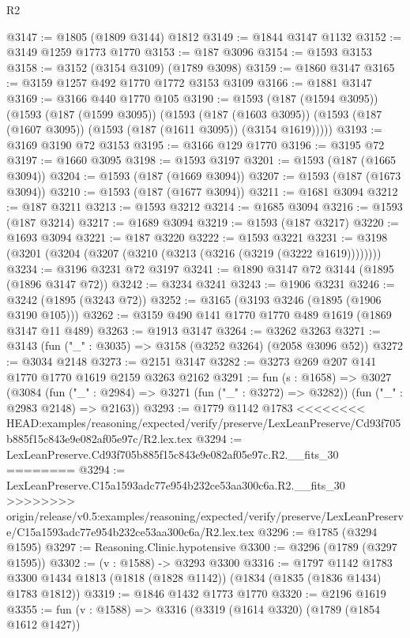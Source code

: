 \begin{lexlean}{R2}
\begin{coremodule}
{{{{{{{{{{{{{{{{{{{{{{{{{{{{{{{{{{{{{{{{{{{{{{{{{{{{{{{{{{{{{{{{{{{{{{{{{{{{{{{{{{{{{{{{{{{{@3147 := @1805 (@1809 @3144) @1812
@3149 := @1844 @3147 @1132
@3152 := @3149 @1259 @1773 @1770
@3153 := @187 @3096
@3154 := @1593 @3153
@3158 := @3152 (@3154 @3109) (@1789 @3098)
@3159 := @1860 @3147
@3165 := @3159 @1257 @492 @1770 @1772 @3153 @3109
@3166 := @1881 @3147
@3169 := @3166 @440 @1770 @105
@3190 := @1593
    (@187 (@1594 @3095))
    (@1593
      (@187 (@1599 @3095))
      (@1593
        (@187 (@1603 @3095))
        (@1593 (@187 (@1607 @3095)) (@1593 (@187 (@1611 @3095)) (@3154 @1619)))))
@3193 := @3169 @3190 @72 @3153
@3195 := @3166 @129 @1770
@3196 := @3195 @72
@3197 := @1660 @3095
@3198 := @1593 @3197
@3201 := @1593 (@187 (@1665 @3094))
@3204 := @1593 (@187 (@1669 @3094))
@3207 := @1593 (@187 (@1673 @3094))
@3210 := @1593 (@187 (@1677 @3094))
@3211 := @1681 @3094
@3212 := @187 @3211
@3213 := @1593 @3212
@3214 := @1685 @3094
@3216 := @1593 (@187 @3214)
@3217 := @1689 @3094
@3219 := @1593 (@187 @3217)
@3220 := @1693 @3094
@3221 := @187 @3220
@3222 := @1593 @3221
@3231 := @3198 (@3201 (@3204 (@3207 (@3210 (@3213 (@3216 (@3219 (@3222 @1619))))))))
@3234 := @3196 @3231 @72 @3197
@3241 := @1890 @3147 @72 @3144 (@1895 (@1896 @3147 @72))
@3242 := @3234 @3241
@3243 := @1906 @3231
@3246 := @3242 (@1895 (@3243 @72))
@3252 := @3165 (@3193 @3246 (@1895 (@1906 @3190 @105)))
@3262 := @3159 @490 @141 @1770 @1770 @489 @1619 (@1869 @3147 @11 @489)
@3263 := @1913 @3147
@3264 := @3262 @3263
@3271 := @3143 (fun ("_" : @3035) => @3158 (@3252 @3264) (@2058 @3096 @52))
@3272 := @3034 @2148
@3273 := @2151 @3147
@3282 := @3273 @269 @207 @141 @1770 @1770 @1619 @2159 @3263 @2162
@3291 := fun (s : @1658) =>
  @3027
    (@3084
      (fun ("_" : @2984) => @3271 (fun ("_" : @3272) => @3282))
      (fun ("_" : @2983 @2148) => @2163))
@3293 := @1779 @1142 @1783
<<<<<<<< HEAD:examples/reasoning/expected/verify/preserve/LexLeanPreserve/Cd93f705b885f15c843e9e082af05e97c/R2.lex.tex
@3294 := LexLeanPreserve.Cd93f705b885f15c843e9e082af05e97c.R2.__fits_30
========
@3294 := LexLeanPreserve.C15a1593adc77e954b232ce53aa300c6a.R2.__fits_30
>>>>>>>> origin/release/v0.5:examples/reasoning/expected/verify/preserve/LexLeanPreserve/C15a1593adc77e954b232ce53aa300c6a/R2.lex.tex
@3296 := @1785 (@3294 @1595)
@3297 := Reasoning.Clinic.hypotensive
@3300 := @3296 (@1789 (@3297 @1595))
@3302 := (v : @1588) -> @3293 @3300
@3316 := @1797
    @1142
    @1783
    @3300
    @1434
    @1813
    (@1818 (@1828 @1142))
    (@1834 (@1835 (@1836 @1434) @1783 @1812))
@3319 := @1846 @1432 @1773 @1770
@3320 := @2196 @1619
@3355 := fun (v : @1588) =>
  @3316
    (@3319
      (@1614 @3320)
      (@1789 (@1854 @1612 @1427))
}}}}}}}}}}}}}}}}}}}}}}}}}}}}}}}}}}}}}}}}}}}}}}}}}}}}}}}}}}}}}}}}}}}}}}}}}}}}}}}}}}}}}}}}}}}}
\end{coremodule}
\end{lexlean}
